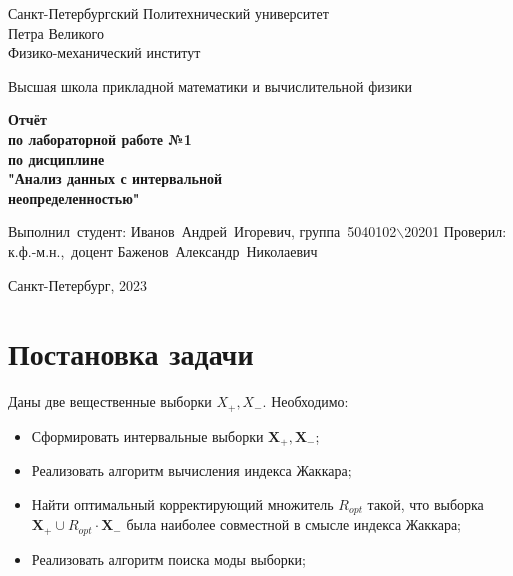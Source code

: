 \documentclass[12pt,a4paper]{article}
\begin{document}
	
	\begin{titlepage}
		
		\begin{center}
			\begin{large}
				Санкт-Петербургский Политехнический университет\\ Петра Великого\\
				Физико-механический институт\\
			\end{large}
			\vspace{0.2cm}
			Высшая школа прикладной математики и вычислительной физики\\
			
		\end{center}
		
		\vspace{3cm}
		\begin{center}
			\textbf{Отчёт\\ по лабораторной работе №1\\ по дисциплине\\ "Анализ данных с интервальной \\неопределенностью"}
		\end{center}
		
		\vspace{3cm}
		
		\vbox{%
			\hfill%
			\vbox{%
				\hbox{Выполнил студент:}%
				\hbox{\break}
				\hbox{Иванов Андрей Игоревич,}%
				\hbox{группа 5040102$\backslash$20201}%
				\hbox{\break}
				\hbox{\break}
				\hbox{Проверил:}
				\hbox{\break}
				\hbox{к.ф.-м.н., доцент}
				\hbox{Баженов Александр Николаевич}
			}%
		} 
		\vfill
		
		\begin{center}
			Санкт-Петербург, 2023
		\end{center}
	
	\end{titlepage}
	\tableofcontents
	\newpage
	
	\listoffigures
	\newpage
	
	\section{Постановка задачи}
            Даны две вещественные выборки $X_{+}, X_{-}$. Необходимо:
            \begin{itemize}
                \item Сформировать интервальные выборки $\mathbf{X_{+}}, \mathbf{X_{-}}$;
                \item Реализовать алгоритм вычисления индекса Жаккара;
                \item Найти оптимальный корректирующий множитель $R_{opt}$ такой, что выборка $\mathbf{X_{+}} \cup R_{opt} \cdot \mathbf{X_{-}}$ была наиболее совместной в смысле индекса Жаккара;
                \item Реализовать алгоритм поиска моды выборки;
            \end{itemize}
	\newpage
	
\end{document}
